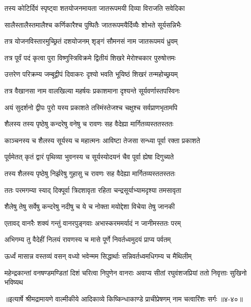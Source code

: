 \twolineshloka
{तस्य कोटिर्दिवं स्पृष्ट्वा शतयोजनमायता}
{जातरूपमयी दिव्या विराजति सवेदिका} %

\twolineshloka
{सालैस्तालैस्तमालैश्च कर्णिकारैश्च पुष्पितैः}
{जातरूपमयैर्दिव्यैः शोभते सूर्यसन्निभैः} %

\twolineshloka
{तत्र योजनविस्तारमुच्छ्रितं दशयोजनम्}
{शृङ्गं सौमनसं नाम जातरूपमयं ध्रुवम्} %

\twolineshloka
{तत्र पूर्वं पदं कृत्वा पुरा विष्णुस्त्रिविक्रमे}
{द्वितीयं शिखरे मेरोश्चकार पुरुषोत्तमः} %

\twolineshloka
{उत्तरेण परिक्रम्य जम्बूद्वीपं दिवाकरः}
{दृश्यो भवति भूयिष्ठं शिखरं तन्महोच्छ्रयम्} %

\twolineshloka
{तत्र वैखानसा नाम वालखिल्या महर्षयः}
{प्रकाशमाना दृश्यन्ते सूर्यवर्णास्तपस्विनः} %

\twolineshloka
{अयं सुदर्शनो द्वीपः पुरो यस्य प्रकाशते}
{तस्मिंस्तेजश्च चक्षुश्च सर्वप्राणभृतामपि} %

\twolineshloka
{शैलस्य तस्य पृष्ठेषु कन्दरेषु वनेषु च}
{रावणः सह वैदेह्या मार्गितव्यस्ततस्ततः} %

\twolineshloka
{काञ्चनस्य च शैलस्य सूर्यस्य च महात्मनः}
{आविष्टा तेजसा सन्ध्या पूर्वा रक्ता प्रकाशते} %

\twolineshloka
{पूर्वमेतत् कृतं द्वारं पृथिव्या भुवनस्य च}
{सूर्यस्योदयनं चैव पूर्वा ह्येषा दिगुच्यते} %

\twolineshloka
{तस्य शैलस्य पृष्ठेषु निर्झरेषु गुहासु च}
{रावणः सह वैदेह्या मार्गितव्यस्ततस्ततः} %

\twolineshloka
{ततः परमगम्या स्याद् दिक्पूर्वा त्रिदशावृता}
{रहिता चन्द्रसूर्याभ्यामदृश्या तमसावृता} %

\twolineshloka
{शैलेषु तेषु सर्वेषु कन्दरेषु नदीषु च}
{ये च नोक्ता मयोद्देशा विचेया तेषु जानकी} %

\twolineshloka
{एतावद् वानरैः शक्यं गन्तुं वानरपुङ्गवाः}
{अभास्करममर्यादं न जानीमस्ततः परम्} %

\twolineshloka
{अभिगम्य तु वैदेहीं निलयं रावणस्य च}
{मासे पूर्णे निवर्तध्वमुदयं प्राप्य पर्वतम्} %

\twolineshloka
{ऊर्ध्वं मासान्न वस्तव्यं वसन् वध्यो भवेन्मम}
{सिद्धार्थाः सन्निवर्तध्वमधिगम्य च मैथिलीम्} %

\twolineshloka
{महेन्द्रकान्तां वनषण्डमण्डितां दिशं चरित्वा निपुणेन वानराः}
{अवाप्य सीतां रघुवंशजप्रियां ततो निवृत्ताः सुखिनो भविष्यथ} %


॥इत्यार्षे श्रीमद्रामायणे वाल्मीकीये आदिकाव्ये किष्किन्धाकाण्डे प्राचीप्रेषणम् नाम चत्वारिंशः सर्गः ॥४-४०॥
